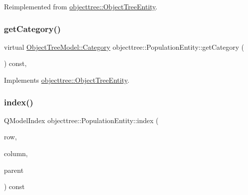 Reimplemented from \mbox{\hyperlink{classobjecttree_1_1_object_tree_entity_a71042bfb5a8328bcbde9d283c0b1b28c}{objecttree\+::\+Object\+Tree\+Entity}}.

\mbox{\label{classobjecttree_1_1_population_entity_a33b674727f9f1aa1bcebd65e07b30e8d}} 
\subsubsection{\texorpdfstring{getCategory()}{getCategory()}}
{\footnotesize\ttfamily virtual \mbox{\hyperlink{class_object_tree_model_a379e9d6b0d381853785adf62095ba4e3}{Object\+Tree\+Model\+::\+Category}} objecttree\+::\+Population\+Entity\+::get\+Category (\begin{DoxyParamCaption}{ }\end{DoxyParamCaption}) const\hspace{0.3cm}{\ttfamily [inline]}, {\ttfamily [virtual]}}



Implements \mbox{\hyperlink{classobjecttree_1_1_object_tree_entity_aa4e80e7fa80672c1b9902add665abc77}{objecttree\+::\+Object\+Tree\+Entity}}.

\mbox{\label{classobjecttree_1_1_population_entity_a66228e77f0aff3907f18a3a629e37136}} 
\subsubsection{\texorpdfstring{index()}{index()}}
{\footnotesize\ttfamily Q\+Model\+Index objecttree\+::\+Population\+Entity\+::index (\begin{DoxyParamCaption}\item[{int}]{row,  }\item[{int}]{column,  }\item[{const Q\+Model\+Index \&}]{parent }\end{DoxyParamCaption}) const\hspace{0.3cm}{\ttfamily [virtual]}}



